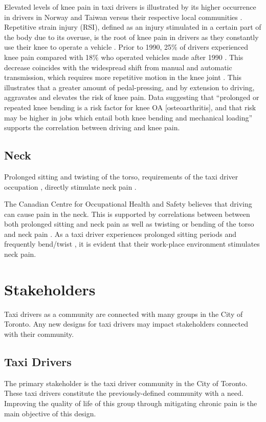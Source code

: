 \documentclass[11pt]{article}
\begin{document}
Elevated levels of knee pain in taxi drivers is illustrated by its higher occurrence in drivers 
in Norway and Taiwan versus their respective local communities \cite{KneePain}. Repetitive strain 
injury (RSI), defined as an injury stimulated in a certain part of the body due to its overuse, is the 
root of knee pain in drivers \cite{RSI} as they constantly use their knee to operate a vehicle 
\cite{KneePain}. Prior to 1990, 25\% of drivers experienced knee pain compared with 18\% who 
operated vehicles made after 1990 \cite{KneePain}. This decrease coincides with the widespread shift from 
manual and automatic transmission, which requires more repetitive motion in the knee joint 
\cite{KneePain}. This illustrates that a greater amount of pedal-pressing, and by extension to 
driving, aggravates and elevates the risk of knee pain. Data suggesting that “prolonged or repeated 
knee bending is a risk factor for knee OA [osteoarthritis], and that risk may be higher in jobs which 
entail both knee bending and mechanical loading” \cite{Osteoarthritis} supports the correlation 
between driving and knee pain.



\subsection{Neck}
Prolonged sitting and twisting of the torso, requirements of the taxi driver occupation \cite{neck}, 
directly stimulate neck pain \cite{neck}. 

The Canadian Centre for Occupational Health and Safety believes that driving can cause pain in the 
neck\cite{proof}. This is supported by correlations between between both prolonged sitting and neck pain as well as  
twisting or bending of the torso and neck pain \cite{neck}. 
As a taxi driver experiences prolonged sitting periods and frequently bend/twist \cite{Okunribido2008, POSTULATED},
it is evident that their work-place environment stimulates neck pain. 
\section{Stakeholders}
\label{sec:stake}
Taxi drivers as a community are connected with many groups in the City
of Toronto. Any new designs for taxi drivers may impact
stakeholders connected with their community.
 
\subsection{Taxi Drivers}
The primary stakeholder is the taxi driver community in the City of
Toronto. These taxi drivers constitute the previously-defined community with a
need. Improving the quality of life of this group through mitigating
chronic pain is the main objective of this design.
 
\end{document}
